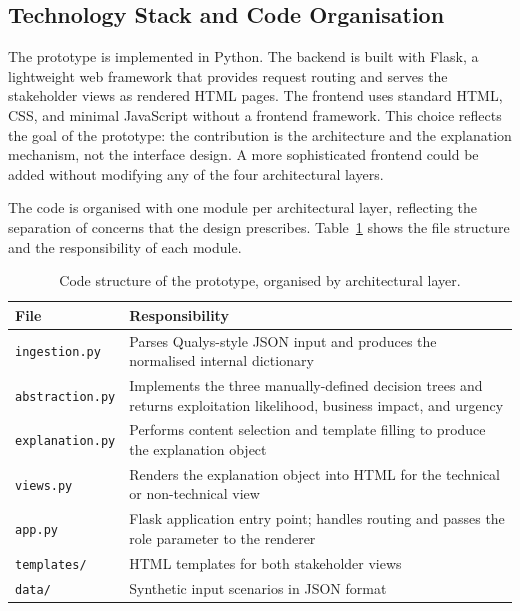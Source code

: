\subsection{Technology Stack and Code Organisation}

The prototype is implemented in Python. The backend is built with Flask, a lightweight web framework that provides request routing and serves the stakeholder views as rendered HTML pages. The frontend uses standard HTML, CSS, and minimal JavaScript without a frontend framework. This choice reflects the goal of the prototype: the contribution is the architecture and the explanation mechanism, not the interface design. A more sophisticated frontend could be added without modifying any of the four architectural layers.

The code is organised with one module per architectural layer, reflecting the separation of concerns that the design prescribes. Table~\ref{tab:code-structure} shows the file structure and the responsibility of each module.

\begin{table}[h]
\centering
\begin{tabular}{@{}lp{}@{}}
\toprule
\textbf{File} & \textbf{Responsibility} \\
\midrule
\texttt{ingestion.py}        & Parses Qualys-style JSON input and produces the normalised internal dictionary \\
\texttt{abstraction.py} & Implements the three manually-defined 
decision trees and returns exploitation likelihood, business impact, 
and urgency \\
\texttt{explanation.py}      & Performs content selection and template filling to produce the explanation object \\
\texttt{views.py}            & Renders the explanation object into HTML for the technical or non-technical view \\
\texttt{app.py}              & Flask application entry point; handles routing and passes the role parameter to the renderer \\
\texttt{templates/}          & HTML templates for both stakeholder views \\
\texttt{data/}               & Synthetic input scenarios in JSON format \\
\bottomrule
\end{tabular}
\caption{Code structure of the prototype, organised by architectural layer.}
\label{tab:code-structure}
\end{table}


